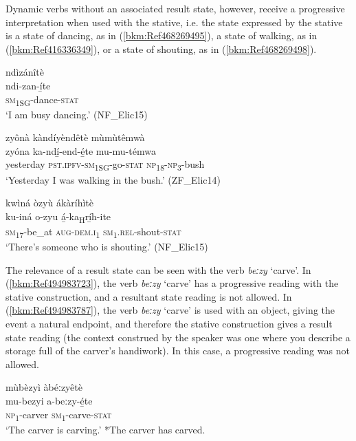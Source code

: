 Dynamic verbs without an associated result state, however, receive a progressive interpretation when used with the stative, i.e. the state expressed by the stative is a state of dancing, as in (\ref{bkm:Ref468269495}), a state of walking, as in (\ref{bkm:Ref416336349}), or a state of shouting, as in (\ref{bkm:Ref468269498}).

\ea
\label{bkm:Ref468269495}
\glll ndìzánîtè\\
ndi-zan-í̲te\\
\textsc{sm}\textsubscript{1SG}-dance-\textsc{stat}\\
\glt ‘I am busy dancing.’ (NF\_Elic15)
\z

\ea
\label{bkm:Ref416336349}
zyônà kàndíyèndêtè mùmùtêmwà\\
\gll zyóna    ka-ndí̲-end-é̲te    mu-mu-témwa\\
yesterday  \textsc{pst}.\textsc{ipfv}-\textsc{sm}\textsubscript{1SG}-go-\textsc{stat}  \textsc{np}\textsubscript{18}-\textsc{np}\textsubscript{3}-bush\\
\glt ‘Yesterday I was walking in the bush.’ (ZF\_Elic14)
\z

\ea
\label{bkm:Ref468269498}
kwìná òzyù ákàríhìtè\\
\gll ku-iná  o-zyu    á̲-ka\textsubscript{H}rí̲h-ite\\
\textsc{sm}\textsubscript{17}-be\_at  \textsc{aug}-\textsc{dem}.\textsc{i}\textsubscript{1}  \textsc{sm}\textsubscript{1}.\textsc{rel}-shout-\textsc{stat}\\
\glt ‘There’s someone who is shouting.’ (NF\_Elic15)
\z

The relevance of a result state can be seen with the verb \textit{beːzy} ‘carve’. In (\ref{bkm:Ref494983723}), the verb \textit{beːzy} ‘carve’ has a progressive reading with the stative construction, and a resultant state reading is not allowed. In (\ref{bkm:Ref494983787}), the verb \textit{beːzy} ‘carve’ is used with an object, giving the event a natural endpoint, and therefore the stative construction gives a result state reading (the context construed by the speaker was one where you describe a storage full of the carver’s handiwork). In this case, a progressive reading was not allowed.

\ea
\label{bkm:Ref494983723}
mùbèzyì àbéːzyêtè\\
\gll mu-bezyi  a-beːzy-é̲te\\
\textsc{np}\textsubscript{1}-carver  \textsc{sm}\textsubscript{1}-carve-\textsc{stat}\\
\glt ‘The carver is carving.’ *The carver has carved.
\z

